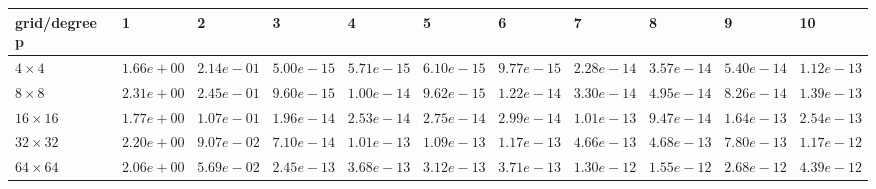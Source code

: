 \begin{tabular}{lllllllllll}
\hline
 grid/degree p   & 1          & 2          & 3          & 4          & 5          & 6          & 7          & 8          & 9          & 10         \\
\hline
 $4 \times 4$    & $1.66e+00$ & $2.14e-01$ & $5.00e-15$ & $5.71e-15$ & $6.10e-15$ & $9.77e-15$ & $2.28e-14$ & $3.57e-14$ & $5.40e-14$ & $1.12e-13$ \\
 $8 \times 8$    & $2.31e+00$ & $2.45e-01$ & $9.60e-15$ & $1.00e-14$ & $9.62e-15$ & $1.22e-14$ & $3.30e-14$ & $4.95e-14$ & $8.26e-14$ & $1.39e-13$ \\
 $16 \times 16$  & $1.77e+00$ & $1.07e-01$ & $1.96e-14$ & $2.53e-14$ & $2.75e-14$ & $2.99e-14$ & $1.01e-13$ & $9.47e-14$ & $1.64e-13$ & $2.54e-13$ \\
 $32 \times 32$  & $2.20e+00$ & $9.07e-02$ & $7.10e-14$ & $1.01e-13$ & $1.09e-13$ & $1.17e-13$ & $4.66e-13$ & $4.68e-13$ & $7.80e-13$ & $1.17e-12$ \\
 $64 \times 64$  & $2.06e+00$ & $5.69e-02$ & $2.45e-13$ & $3.68e-13$ & $3.12e-13$ & $3.71e-13$ & $1.30e-12$ & $1.55e-12$ & $2.68e-12$ & $4.39e-12$ \\
\hline
\end{tabular}
